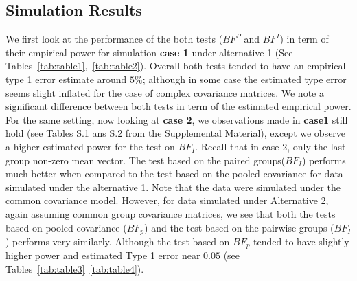 \documentclass[12pt]{article}
\begin{document}
\subsection{Simulation Results}
We first look at the performance of the both tests ($BF^{P}$ and $BF^{I}$) in term of their empirical power for simulation {\bf case 1} under alternative 1 (See Tables~\ref{tab:table1},~\ref{tab:table2}). 
Overall both tests tended to have an empirical type 1 error estimate around $5\%$; although in  some case the estimated type error seems slight inflated for the case of complex covariance matrices. 
We note a significant difference between both tests in term of the estimated empirical power. 
For the same setting, now looking at {\bf case 2}, we observations made in {\bf case1} still hold (see Tables S.1 ans S.2 from the Supplemental Material), except we observe a higher estimated power for the test on $BF_{I}$. Recall that in case 2, only the last group non-zero mean vector. 
The test based on the paired groups($BF_{I}$) performs much better when compared to the test based on the pooled covariance for data simulated under the alternative 1. 
Note that the data were simulated under the common covariance model. 
However, for data simulated under Alternative 2, again assuming common group covariance matrices, we see that both the tests based on pooled covariance ($BF_p$) and the test based on the pairwise groups ($BF_I$) performs very similarly. Although the test based on $BF_{p}$ tended to have slightly higher power and estimated Type 1 error near $0.05$ (see Tables~\ref{tab:table3}~\ref{tab:table4}).
\end{document}
